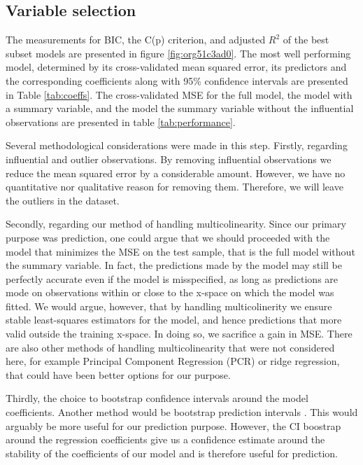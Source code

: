 \documentclass[11pt]{article}
\begin{document}


\subsection{Variable selection}
\label{sec:org83cebf2}

The measurements for BIC, the C(p) criterion, and adjusted \(R^2\) of the best subset models are presented
in figure \ref{fig:org51c3ad0}. The most well performing model, determined by its cross-validated 
mean squared error, its predictors and the corresponding coefficients along with 95\% confidence intervals are 
presented in Table \ref{tab:coeffs}. The cross-validated MSE for the full model, the model with a summary variable, 
and the model the summary variable without the influential observations are presented in table
\ref{tab:performance}. 

Several methodological considerations were made in this step. Firstly, regarding influential and outlier 
observations. By removing influential observations we reduce the mean squared error by a considerable amount.
However, we have no quantitative nor qualitative reason for removing them. Therefore, we will leave the 
outliers in the dataset. 

Secondly, regarding our method of handling multicolinearity. Since our primary purpose was prediction, 
one could argue that we should proceeded with the model that minimizes the MSE on the test sample, that is
the full model without the summary variable. In fact, the predictions made by the model may still be 
perfectly accurate even if the model is misspecified, as long as predictions are mode on observations within or
close to the x-space on which the model was fitted. \cite{Montgomery2012} We would argue, however, that by
handling multicolinerity we ensure stable least-squares estimators for the model, and hence predictions  
that more valid outside the training x-space. In doing so, we sacrifice a gain in MSE. 
There are also other methods of handling multicolinearity that were not considered here, for example
Principal Component Regression (PCR) or ridge regression, that could have been better 
options for our purpose.

Thirdly, the choice to bootstrap confidence intervals around the model coefficients. Another method 
would be bootstrap prediction intervals \cite{davison_hinkley_1997}. This 
would arguably be more useful for our prediction purpose. However, the CI boostrap around the regression 
coefficients give us a confidence estimate around the stability of the coefficients of our model and is
therefore useful for prediction.
\end{document}
